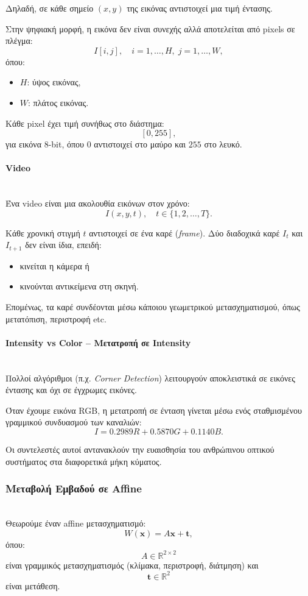 \documentclass[12pt]{article}
\begin{document}
Δηλαδή, σε κάθε σημείο \((x,y)\) της εικόνας αντιστοιχεί μια τιμή έντασης.

Στην ψηφιακή μορφή, η εικόνα δεν είναι συνεχής αλλά αποτελείται από pixels σε πλέγμα:
\[
I[i,j], \quad i = 1,\ldots,H,\; j = 1,\ldots,W,
\]
όπου:
\begin{itemize}
    \item \(H\): ύψος εικόνας,
    \item \(W\): πλάτος εικόνας.
\end{itemize}

Κάθε pixel έχει τιμή συνήθως στο διάστημα:
\[
[0,255],
\]
για εικόνα 8-bit, όπου \(0\) αντιστοιχεί στο μαύρο και \(255\) στο λευκό.

\paragraph{Video}
\mbox{}\\
Ένα video είναι μια ακολουθία εικόνων στον χρόνο:
\[
I(x,y,t), \quad t \in \{1,2,\ldots,T\}.
\]

Κάθε χρονική στιγμή \(t\) αντιστοιχεί σε ένα καρέ (\textit{frame}). Δύο διαδοχικά καρέ \(I_t\) και \(I_{t+1}\) δεν είναι ίδια, επειδή:
\begin{itemize}
    \item κινείται η κάμερα ή
    \item κινούνται αντικείμενα στη σκηνή.
\end{itemize}

Επομένως, τα καρέ συνδέονται μέσω κάποιου γεωμετρικού μετασχηματισμού, όπως μετατόπιση, περιστροφή etc.

\paragraph{Intensity vs Color – Μετατροπή σε Intensity}
\mbox{}\\
Πολλοί αλγόριθμοι (π.χ. \textit{Corner Detection}) λειτουργούν αποκλειστικά σε εικόνες έντασης και όχι σε έγχρωμες εικόνες.

Όταν έχουμε εικόνα RGB, η μετατροπή σε ένταση γίνεται μέσω ενός σταθμισμένου γραμμικού συνδυασμού των καναλιών:
\[
I = 0.2989R + 0.5870G + 0.1140B.
\]

Οι συντελεστές αυτοί αντανακλούν την ευαισθησία του ανθρώπινου οπτικού συστήματος στα διαφορετικά μήκη κύματος.





\subsubsection{Μεταβολή Εμβαδού σε Affine}
\mbox{}\\
Θεωρούμε έναν affine μετασχηματισμό:
\[
W(\mathbf{x}) = A\mathbf{x} + \mathbf{t},
\]
όπου:
\[
A \in \mathbb{R}^{2 \times 2}
\]
είναι γραμμικός μετασχηματισμός (κλίμακα, περιστροφή, διάτμηση) και
\[
\mathbf{t} \in \mathbb{R}^2
\]
είναι μετάθεση.
\end{document}
